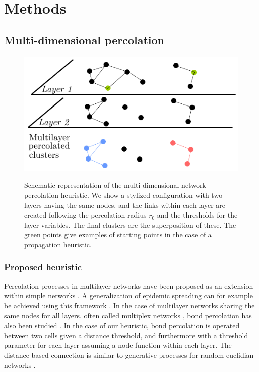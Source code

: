 \documentclass{jimis-en}
\begin{document}



\section{Methods}




\subsection{Multi-dimensional percolation}



\begin{figure}[ht] 
  {\includegraphics[width=\linewidth]{figures/principle.pdf}}
  \centering
  \caption{Schematic representation of the multi-dimensional network percolation heuristic. We show a stylized configuration with two layers having the same nodes, and the links within each layer are created following the percolation radius $r_0$ and the thresholds for the layer variables. The final clusters are the superposition of these. The green points give examples of starting points in the case of a propagation heuristic.\label{fig:method}}
\end{figure}


\subsubsection{Proposed heuristic}

Percolation processes in multilayer networks have been proposed as an extension within simple networks \citep{boccaletti2014structure}. A generalization of epidemic spreading can for example be achieved using this framework \citep{son2012percolation}. In the case of multilayer networks sharing the same nodes for all layers, often called multiplex networks \citep{aleta2018multilayer}, bond percolation has also been studied \citep{hackett2016bond}. In the case of our heuristic, bond percolation is operated between two cells given a distance threshold, and furthermore with a threshold parameter for each layer assuming a node function within each layer. The distance-based connection is similar to generative processes for random euclidian networks \citep{penrose1999k}.
\end{document}
